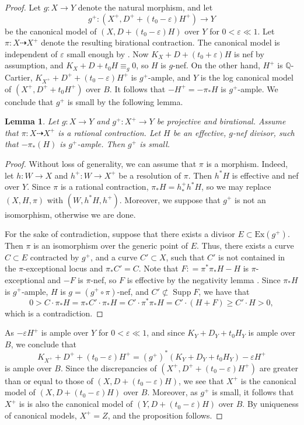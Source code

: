 \documentclass[11pt]{amsart}
\newtheorem{lemma}[theorem]{Lemma}
\theoremstyle{definition}
\theoremstyle{remark}
\newcommand{\Supp}{\operatorname{Supp}}
\begin{document}
	\begin{proof} Let $g : X \to Y$ denote the natural morphism, and let $$g^+ : (X^+, D^+ + (t_0 - \varepsilon)H^+) \to Y$$ be the canonical model of $(X, D + (t_0 - \varepsilon)H)$ over $Y$ for $0 < \varepsilon \ll 1$. Let $\pi : X \dashrightarrow X^+$ denote the resulting birational contraction. The canonical model is independent of $\varepsilon$ small enough by \cite[Corollary 1.1.5]{BCHM10}. Now $K_X + D + (t_0 + \varepsilon)H$ is nef by assumption, and $K_X + D + t_0H \equiv_g 0$, so $H$ is $g$-nef. On the other hand, $H^+$ is $\mathbb{Q}$-Cartier, $K_{X^+} + D^+ + (t_0 - \varepsilon)H^+$ is $g^+$-ample, and $Y$ is the log canonical model of $(X^+, D^+ + t_0H^+)$ over $B$. It follows that $-H^+ = -\pi_*H$ is $g^+$-ample. We conclude that $g^+$ is small by the following lemma. 
		
		\begin{lemma}\label{lemma:small}
			Let $g: X \to Y$ and $g^+: X^+ \to Y$ be projective and birational. Assume that $\pi: X \dashrightarrow X^+$ is a rational contraction. Let $H$ be an effective, $g$-nef divisor, such that $-\pi_*(H)$ is $g^+$-ample. 
			Then $g^+$ is small.\end{lemma}
		
		\begin{proof} 
			Without loss of generality, we can assume that $\pi$ is a morphism. Indeed, let $h : W \to X$ and $h^+ : W \to X^+$ be a resolution of $\pi$. Then $h^*H$ is effective and nef over $Y$. Since $\pi$ is a rational contraction, $\pi_*H = h^+_*h^*H$, so we may replace $(X,H, \pi)$ with $(W, h^*H, h^+)$. Moreover, we suppose that $g^+$ is not an isomorphism, otherwise we are done.
			
			For the sake of contradiction, suppose that there exists a divisor $E \subset \mathrm{Ex}(g^+)$. Then $\pi$ is an isomorphism over the generic point of $E$. Thus, there exists a curve $C \subset E$ contracted by $g^+$, and a curve $C' \subset X$, such that $C'$ is not contained in the $\pi$-exceptional locus and $\pi_*C' = C$. Note that $F: = \pi^*\pi_*H - H$ is $\pi$-exceptional and $-F$ is $\pi$-nef, so $F$ is effective by the negativity lemma \cite[Lemma 3.39]{KM98}. Since $\pi_*H$ is $g^+$-ample, $H$ is $g = (g^+ \circ \pi)$-nef, and $C' \not \subset \Supp F$, we have that
			$$
			0>C\cdot\pi_*H= \pi_*C'\cdot\pi_*H = C' \cdot \pi^*\pi_*H = C'\cdot (H + F) \ge C'\cdot H > 0,
			$$
			which is a contradiction. \end{proof} 
		
		
		
		As $-\varepsilon H^+$ is ample over $Y$ for $0 < \varepsilon \ll 1$, and since $K_Y + D_Y + t_0H_Y$ is ample over $B$, we conclude that \[K_{X^+}+D^+ + (t_0 - \varepsilon)H^+ = (g^+)^*(K_Y + D_Y + t_0H_Y)- \varepsilon H^+\] is ample over $B$. Since the discrepancies of $(X^+, D^+ + (t_0 - \varepsilon)H^+)$ are greater than or equal to those of $(X, D + (t_0 - \varepsilon)H)$, we see that $X^+$ is the canonical model of $(X, D + (t_0 - \varepsilon)H)$ over $B$. Moreover, as $g^+$ is small, it follows that $X^+$ is is also the canonical model of $(Y, D + (t_0 -\varepsilon)H)$ over $B$.  By uniqueness of canonical models, $X^+ = Z$, and the proposition follows.\end{proof} 
	
\end{document}
